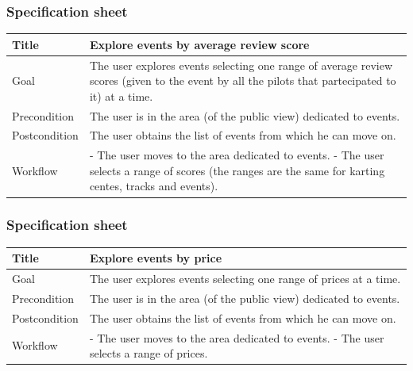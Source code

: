 \documentclass{beamer}
\begin{document}
\begin{frame}
    \frametitle{Specification sheet}
    \begin{table}
        \tiny
        \begin{tabular}{|p{2cm}|p{6cm}|}
        \hline
        Title & \textbf{Explore events by average review score} \\
        \hline
        Goal & The user explores events selecting one range of average review scores (given to the event by all the pilots
        that partecipated to it) at a time. \\
        \hline
        Precondition & The user is in the area (of the public view) dedicated to events.\\
        \hline
        Postcondition & The user obtains the list of events from which he can move on.\\
        \hline
        Workflow &
        - The user moves to the area dedicated to events. \newline
        - The user selects a range of scores (the ranges are the same for karting centes, tracks and events). \\
        \hline
        \end{tabular}
\end{table}
\end{frame}

\begin{frame}
    \frametitle{Specification sheet}
    \begin{table}
        \tiny
        \begin{tabular}{|p{2cm}|p{6cm}|}
        \hline
        Title & \textbf{Explore events by price} \\
        \hline
        Goal & The user explores events selecting one range of prices at a time. \\
        \hline
        Precondition & The user is in the area (of the public view) dedicated to events.\\
        \hline
        Postcondition & The user obtains the list of events from which he can move on.\\
        \hline
        Workflow &
        - The user moves to the area dedicated to events. \newline
        - The user selects a range of prices. \\
        \hline
        \end{tabular}
\end{table}
\end{frame}
\end{document}

